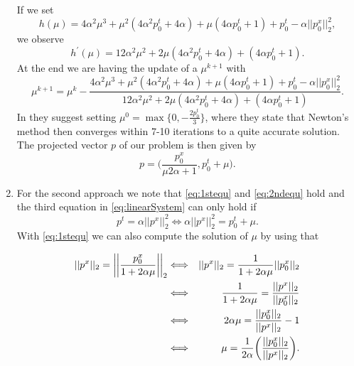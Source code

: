 \begin{enumerate}
        If we set
        $$
            h(\mu) = 4 \alpha^{2} \mu^{3} + \mu^{2} (4 \alpha^{2} p_{0}^{t} + 4 \alpha) + \mu(4 \alpha p_{0}^{t} + 1) + p_{0}^{t} - \alpha ||p_{0}^{x}||_{2}^{2},
        $$
        we observe
        $$
            h^{'}(\mu) = 12 \alpha^{2} \mu^{2} + 2 \mu (4 \alpha^{2} p_{0}^{t} + 4 \alpha) + (4 \alpha p_{0}^{t} + 1).
        $$
        At the end we are having the update of a $\mu^{k+1}$ with
        \begin{equation}
            \mu^{k+1} = \mu^{k} - \frac{4 \alpha^{2} \mu^{3} + \mu^{2} (4 \alpha^{2} p_{0}^{t} + 4 \alpha) + \mu(4 \alpha p_{0}^{t} + 1) + p_{0}^{t} - \alpha ||p_{0}^{x}||_{2}^{2}}{12 \alpha^{2} \mu^{2} + 2 \mu (4 \alpha^{2} p_{0}^{t} + 4 \alpha) + (4 \alpha p_{0}^{t} + 1)}.
        \end{equation}
        In \cite{Chambolle-et-al-10} they suggest setting $\mu^{0} = \max \{ 0, - \frac{2 p_{0}^{t}}{3} \}$, where they state that Newton's method then converges within 7-10 iterations to a quite accurate solution.\\
        The projected vector $p$ of our problem is then given by
        \begin{equation}
            p = \bigg( \frac{p_{0}^{x}}{\mu 2 \alpha + 1}, p_{0}^{t} + \mu \bigg). \label{eq:newtonSolution}
        \end{equation}

        \item For the second approach we note that \ref{eq:1stequ} and \ref{eq:2ndequ} hold and the third equation in \ref{eq:linearSystem} can only hold if
        \begin{equation}
            p^{t} = \alpha ||p^{x}||_{2}^{2} \Longleftrightarrow \alpha ||p^{x}||_{2}^{2} = p_{0}^{t} + \mu. \label{eq:tmp1}
        \end{equation}
        With \ref{eq:1stequ} we can also compute the solution of $\mu$ by using that

        \begin{eqnarray}
            ||p^{x}||_{2} = \bigg|\bigg| \frac{p_{0}^{x}}{1 + 2 \alpha \mu} \bigg|\bigg|_{2} &\Longleftrightarrow& ||p^{x}||_{2} = \frac{1}{1 + 2 \alpha \mu} ||p_{0}^{x}||_{2} \notag \\
            &\Longleftrightarrow& \frac{1}{1 + 2 \alpha \mu} = \frac{||p^{x}||_{2}}{||p_{0}^{x}||_{2}} \notag \\
            &\Longleftrightarrow& 2 \alpha \mu = \frac{||p_{0}^{x}||_{2}}{||p^{x}||_{2}} - 1 \notag \\
            &\Longleftrightarrow& \mu = \frac{1}{2 \alpha} \bigg( \frac{||p_{0}^{x}||_{2}}{||p^{x}||_{2}} \bigg). \notag
        \end{eqnarray}


\end{enumerate}

